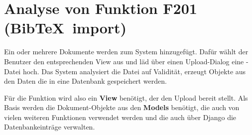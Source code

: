 \section{Analyse von Funktion F201 (Bib\TeX\ import)}
Ein oder mehrere Dokumente werden zum System hinzugefügt. Dafür wählt der
Benutzer den entsprechenden View aus und läd über einen Upload-Dialog eine
\BibTeX -Datei hoch. Das System analysiert die Datei auf Validität, erzeugt
Objekte aus den Daten die in eine Datenbank gespeichert werden.

Für die Funktion wird also ein \textbf{View} benötigt, der den Upload bereit
stellt.  Als Basis werden die Dokument-Objekte aus den \textbf{Models} benötigt,
die auch von vielen weiteren Funktionen verwendet werden und die auch über
Django die Datenbankeinträge verwalten.
